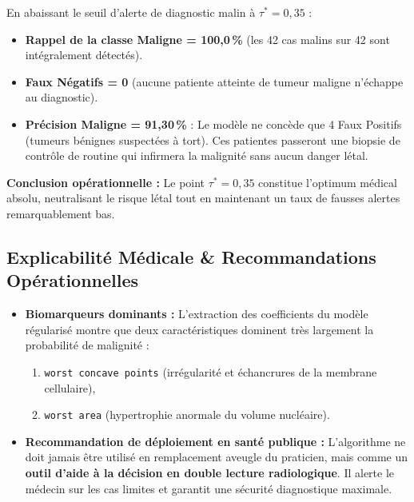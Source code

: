 \documentclass[10pt,a4paper]{article}
\begin{document}
\begin{tcolorbox}[redbox, title={Le Réglage Clinique Optimal : $\tau^* = 0,35$ (ou $0,30$)}]
\small
En abaissant le seuil d'alerte de diagnostic malin à \textbf{$\tau^* = 0,35$} :
\begin{itemize}[leftmargin=0.5cm, itemsep=2pt]
	\item \textbf{Rappel de la classe Maligne = 100,0\,\%} (les 42 cas malins sur 42 sont intégralement détectés).
	\item \textbf{Faux Négatifs = 0} (aucune patiente atteinte de tumeur maligne n'échappe au diagnostic).
	\item \textbf{Précision Maligne = 91,30\,\%} : Le modèle ne concède que 4 Faux Positifs (tumeurs bénignes suspectées à tort). Ces patientes passeront une biopsie de contrôle de routine qui infirmera la malignité sans aucun danger létal.
\end{itemize}
\textbf{Conclusion opérationnelle :} Le point $\tau^* = 0,35$ constitue l'optimum médical absolu, neutralisant le risque létal tout en maintenant un taux de fausses alertes remarquablement bas.
\end{tcolorbox}

\subsection{Explicabilité Médicale \& Recommandations Opérationnelles}
\begin{itemize}[leftmargin=0.6cm, itemsep=2pt]
	\item \textbf{Biomarqueurs dominants :} L'extraction des coefficients du modèle régularisé montre que deux caractéristiques dominent très largement la probabilité de malignité :
	\begin{enumerate}
		\item \texttt{worst concave points} (irrégularité et échancrures de la membrane cellulaire),
		\item \texttt{worst area} (hypertrophie anormale du volume nucléaire).
	\end{enumerate}
	\item \textbf{Recommandation de déploiement en santé publique :} L'algorithme ne doit jamais être utilisé en remplacement aveugle du praticien, mais comme un \textbf{outil d'aide à la décision en double lecture radiologique}. Il alerte le médecin sur les cas limites et garantit une sécurité diagnostique maximale.
\end{itemize}

\newpage
\end{document}
